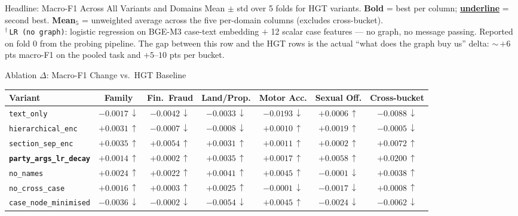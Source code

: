 \documentclass[aspectratio=169,11pt]{beamer}
\newcommand{\best}[1]{{\color{black}\textbf{#1}}}
\newcommand{\runnerup}[1]{{\color{black}\textbf{#1}}}
\begin{document}
\begin{frame}{Headline: Macro-F1 Across All Variants and Domains}
  \vspace{0.5em}
  \scriptsize Mean $\pm$ std over 5 folds for HGT variants. \best{Bold} = best per column; \runnerup{\underline{underline}} = second best. \textbf{Mean$_5$} = unweighted average across the five per-domain columns (excludes cross-bucket).\\
  $^\dagger$\,\texttt{LR (no graph)}: logistic regression on BGE-M3 case-text embedding $+$ 12 scalar case features --- no graph, no message passing. Reported on fold 0 from the probing pipeline. The gap between this row and the HGT rows is the actual ``what does the graph buy us'' delta: $\sim$\,$+6$ pts macro-F1 on the pooled task and $+5$--$10$ pts per bucket.
\end{frame}

\begin{frame}{Ablation $\Delta$: Macro-F1 Change vs.\ HGT Baseline}
  \scriptsize
  \centering
  \setlength{\tabcolsep}{4pt}
  \begin{adjustbox}{max width=\textwidth}
    \begin{tabular}{lcccccc}
      \toprule
      \textbf{Variant} & \textbf{Family} & \textbf{Fin.\ Fraud} & \textbf{Land/Prop.} & \textbf{Motor Acc.} & \textbf{Sexual Off.} & \textbf{Cross-bucket} \\
      \midrule
      \texttt{text\_only}                       & $-0.0017\,\downarrow$ & $-0.0042\,\downarrow$ & $-0.0033\,\downarrow$ & $-0.0193\,\downarrow$ & $+0.0006\,\uparrow$  & $-0.0088\,\downarrow$ \\
      \texttt{hierarchical\_enc}                & $+0.0031\,\uparrow$   & $-0.0007\,\downarrow$ & $-0.0008\,\downarrow$ & $+0.0010\,\uparrow$   & $+0.0019\,\uparrow$  & $-0.0005\,\downarrow$ \\
      \texttt{section\_sep\_enc}                & $+0.0035\,\uparrow$   & $+0.0054\,\uparrow$   & $+0.0031\,\uparrow$   & $+0.0011\,\uparrow$   & $+0.0002\,\uparrow$  & $+0.0072\,\uparrow$   \\
      \best{\texttt{party\_args\_lr\_decay}}    & $+0.0014\,\uparrow$   & $+0.0002\,\uparrow$   & $+0.0035\,\uparrow$   & $+0.0017\,\uparrow$   & $+0.0058\,\uparrow$  & \best{$+0.0200\,\uparrow$} \\
      \texttt{no\_names}                        & $+0.0024\,\uparrow$   & $+0.0022\,\uparrow$   & $+0.0041\,\uparrow$   & $+0.0045\,\uparrow$   & $-0.0001\,\downarrow$ & $+0.0038\,\uparrow$   \\
      \texttt{no\_cross\_case}                  & $+0.0016\,\uparrow$   & $+0.0003\,\uparrow$   & $+0.0025\,\uparrow$   & $-0.0001\,\downarrow$ & $-0.0017\,\downarrow$ & $+0.0008\,\uparrow$   \\
      \texttt{case\_node\_minimised}            & $-0.0036\,\downarrow$ & $-0.0002\,\downarrow$ & $-0.0054\,\downarrow$ & $+0.0045\,\uparrow$   & $-0.0024\,\downarrow$ & $-0.0062\,\downarrow$ \\
      \bottomrule
    \end{tabular}
  \end{adjustbox}


\end{frame}
\end{document}
